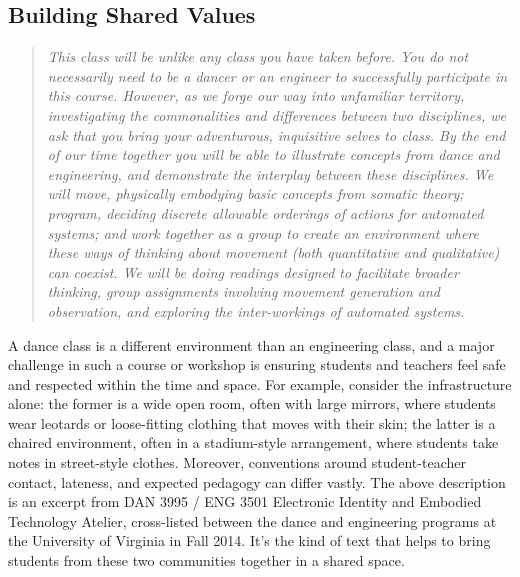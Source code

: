 \documentclass[arts,article,submit,moreauthors,pdftex,10pt,a4paper]{mdpi}
\begin{document}
\subsection{Building Shared Values} \label{values} %


\begin{quote}
\textit{This class will be unlike any class you have taken before. You do not necessarily need to be a dancer or an engineer to successfully participate in this course. However, as we forge our way into unfamiliar territory, investigating the commonalities and differences between two disciplines, we ask that you bring your adventurous, inquisitive selves to class. By the end of our time together you will be able to illustrate concepts from dance and engineering, and demonstrate the interplay between these disciplines. We will move, physically embodying basic concepts from somatic theory; program, deciding discrete allowable orderings of actions for automated systems; and work together as a group to create an environment where these ways of thinking about movement (both quantitative and qualitative) can coexist. We will be doing readings designed to facilitate broader thinking, group assignments involving movement generation and observation, and exploring the inter-workings of automated systems.}
\end{quote}

A dance class is a different environment than an engineering class, and a major challenge in such a course or workshop is ensuring students and teachers feel safe and respected within the time and space.  For example, consider the infrastructure alone: the former is a wide open room, often with large mirrors, where students wear leotards or loose-fitting clothing that moves with their skin; the latter is a chaired environment, often in a stadium-style arrangement, where students take notes in street-style clothes.  Moreover, conventions around student-teacher contact, lateness, and expected pedagogy can differ vastly.  The above description is an excerpt from  DAN 3995 / ENG 3501 Electronic Identity and Embodied Technology Atelier, cross-listed between the dance and engineering programs at the University of Virginia in Fall 2014.  It's the kind of text that helps to bring students from these two communities together in a shared space.
\end{document}
